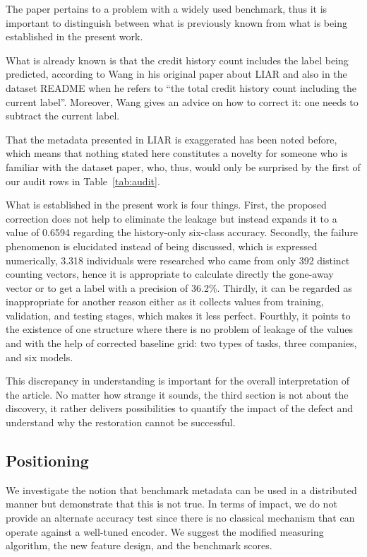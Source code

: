 The paper pertains to a problem with a widely used benchmark, thus it is important to distinguish between what is previously known from what is being established in the present work.

What is already known is that the credit history count includes the label being predicted, according to Wang \cite{wang2017liar} in his original paper about LIAR and also in the dataset README when he refers to ``the total credit history count including the current label''. Moreover, Wang gives an advice on how to correct it: one needs to subtract the current label.

That the metadata presented in LIAR is exaggerated has been noted before, which means that nothing stated here constitutes a novelty for someone who is familiar with the dataset paper, who, thus, would only be surprised by the first of our audit rows in Table~\ref{tab:audit}.

What is established in the present work is four things. First, the proposed correction does not help to eliminate the leakage but instead expands it to a value of 0.6594 regarding the history-only six-class accuracy. Secondly, the failure phenomenon is elucidated instead of being discussed, which is expressed numerically, 3.318 individuals were researched who came from only 392 distinct counting vectors, hence it is appropriate to calculate directly the gone-away vector or to get a label with a precision of 36.2\%. Thirdly, it can be regarded as inappropriate for another reason either as it collects values from training, validation, and testing stages, which makes it less perfect. Fourthly, it points to the existence of one structure where there is no problem of leakage of the values and with the help of corrected baseline grid: two types of tasks, three companies, and six models.

This discrepancy in understanding is important for the overall interpretation of the article. No matter how strange it sounds, the third section is not about the discovery, it rather delivers possibilities to quantify the impact of the defect and understand why the restoration cannot be successful.

\subsection{Positioning}

We investigate the notion that benchmark metadata can be used in a distributed manner but demonstrate that this is not true. In terms of impact, we do not provide an alternate accuracy test since there is no classical mechanism that can operate against a well-tuned encoder. We suggest the modified measuring algorithm, the new feature design, and the benchmark scores.

